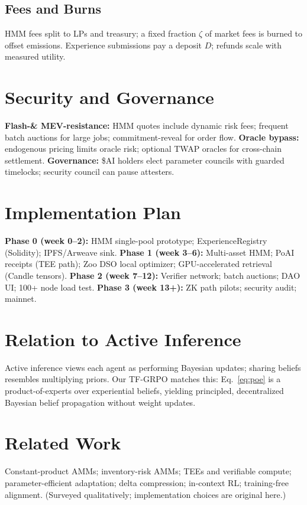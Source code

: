 \documentclass[11pt]{article}
\begin{document}
\subsection{Fees and Burns}
HMM fees split to LPs and treasury; a fixed fraction \(\zeta\) of market fees is burned to offset emissions. Experience submissions pay a deposit \(D\); refunds scale with measured utility.

\section{Security and Governance}
\textbf{Flash-\& MEV-resistance:} HMM quotes include dynamic risk fees; frequent batch auctions for large jobs; commitment-reveal for order flow. \textbf{Oracle bypass:} endogenous pricing limits oracle risk; optional TWAP oracles for cross-chain settlement. \textbf{Governance:} \$AI holders elect parameter councils with guarded timelocks; security council can pause attesters.

\section{Implementation Plan}
\textbf{Phase 0 (week 0--2):} HMM single-pool prototype; ExperienceRegistry (Solidity); IPFS/Arweave sink. \textbf{Phase 1 (week 3--6):} Multi-asset HMM; PoAI receipts (TEE path); Zoo DSO local optimizer; GPU-accelerated retrieval (Candle tensors). \textbf{Phase 2 (week 7--12):} Verifier network; batch auctions; DAO UI; 100+ node load test. \textbf{Phase 3 (week 13+):} ZK path pilots; security audit; mainnet.

\section{Relation to Active Inference}
Active inference views each agent as performing Bayesian updates; sharing beliefs resembles multiplying priors. Our TF-GRPO matches this: Eq.~\eqref{eq:poe} is a product-of-experts over experiential beliefs, yielding principled, decentralized Bayesian belief propagation without weight updates.

\section{Related Work}
Constant-product AMMs; inventory-risk AMMs; TEEs and verifiable compute; parameter-efficient adaptation; delta compression; in-context RL; training-free alignment. (Surveyed qualitatively; implementation choices are original here.)
\end{document}
